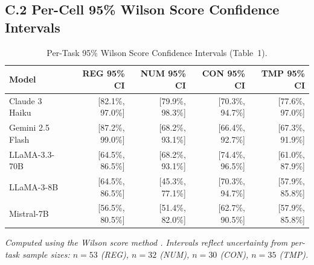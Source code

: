 \documentclass[11pt]{article}
\begin{document}
\subsection*{C.2 Per-Cell 95\% Wilson Score Confidence Intervals}

\begin{table}[h]
\centering
\caption{Per-Task 95\% Wilson Score Confidence Intervals (Table~1).}
\label{tab:wilson_ci}
\begin{tabular}{lrrrr}
\toprule
\textbf{Model} & \textbf{REG 95\% CI} & \textbf{NUM 95\% CI} & \textbf{CON 95\% CI} & \textbf{TMP 95\% CI} \\
\midrule
Claude 3 Haiku    & {[82.1\%, 97.0\%]} & {[79.9\%, 98.3\%]} & {[70.3\%, 94.7\%]} & {[77.6\%, 97.0\%]} \\
Gemini 2.5 Flash  & {[87.2\%, 99.0\%]} & {[68.2\%, 93.1\%]} & {[66.4\%, 92.7\%]} & {[67.3\%, 91.9\%]} \\
LLaMA-3.3-70B     & {[64.5\%, 86.5\%]} & {[68.2\%, 93.1\%]} & {[74.4\%, 96.5\%]} & {[61.0\%, 87.9\%]} \\
LLaMA-3-8B        & {[64.5\%, 86.5\%]} & {[45.3\%, 77.1\%]} & {[70.3\%, 94.7\%]} & {[57.9\%, 85.8\%]} \\
Mistral-7B        & {[56.5\%, 80.5\%]} & {[51.4\%, 82.0\%]} & {[62.7\%, 90.5\%]} & {[57.9\%, 85.8\%]} \\
\bottomrule
\end{tabular}
\end{table}

\noindent\textit{Computed using the Wilson score method \citep{wilson1927probable}.
Intervals reflect uncertainty from per-task sample sizes: $n = 53$ (REG),
$n = 32$ (NUM), $n = 30$ (CON), $n = 35$ (TMP).}
\end{document}
